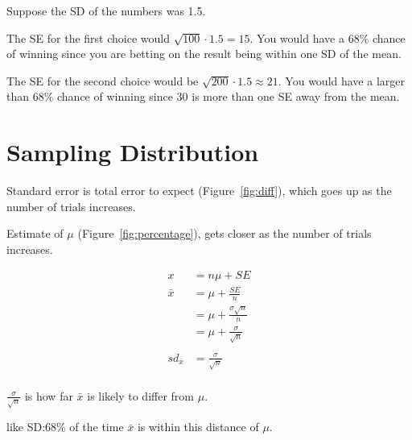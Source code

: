 \documentclass[letterpaper]{exam}
\begin{document}
\begin{enumerate}
\begin{solution}

        Suppose the SD of the numbers was 1.5.
        
        The SE for the first choice would $\sqrt{100} \cdot 1.5 = 15$. You would
        have a 68\% chance of winning since you are betting on the result being
        within one SD of the mean. 
        
        The SE for the second choice would be $\sqrt{200} \cdot 1.5 \approx 21$.
        You would have a larger than 68\% chance of winning since 30 is more
        than one SE away from the mean.

      \end{solution}
  \end{enumerate}

  \section{Sampling Distribution}

  Standard error is total error to expect (Figure~\ref{fig:diff}), which goes up
  as the number of trials increases.

  Estimate of $\mu$ (Figure~\ref{fig:percentage}), gets closer
  as the number of trials increases.

  \begin{align*}
    x            & = n \mu + SE \\
    \bar{x}      & = \mu + \frac{SE}{n} \\
                 & = \mu + \frac{\sigma \sqrt{n}}{n} \\
                 & = \mu + \frac{\sigma}{\sqrt{n}} \\
    \\
    sd_{\bar{x}} & = \frac{\sigma}{\sqrt{n}} \\
  \end{align*}

  \begin{itemize*}
    \item $\frac{\sigma}{\sqrt{n}}$ is how far $\bar{x}$ is likely to differ
      from $\mu$.
    \item like SD:\@ 68\% of the time $\bar{x}$ is within this distance of
      $\mu$.
  \end{itemize*}
\end{document}

